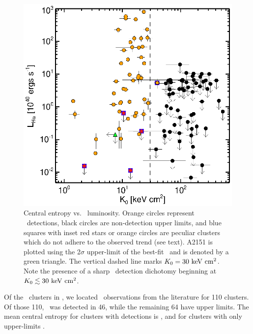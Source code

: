 \documentclass{emulateapj}
\begin{document}
\begin{figure}
  \begin{center}
    \includegraphics*[width=\columnwidth, trim=28mm 7mm 40mm 17mm, clip]{f1.eps}
    \caption{Central entropy vs. \halpha\ luminosity. Orange circles
      represent \halpha\ detections, black circles are non-detection
      upper limits, and blue squares with inset red stars or orange
      circles are peculiar clusters which do not adhere to the
      observed trend (see text). A2151 is plotted using the 2$\sigma$
      upper-limit of the best-fit \kna\ and is denoted by a green
      triangle. The vertical dashed line marks $K_0 = 30 \mathrm{\mbox{\ensuremath{\mathrm{~keV}}} \mathrm{\mbox{\ensuremath{\mathrm{~cm}}}^2}}$. Note
      the presence of a sharp \halpha\ detection dichotomy beginning
      at $K_0 \lesssim 30 \mathrm{\mbox{\ensuremath{\mathrm{~keV}}} \mathrm{\mbox{\ensuremath{\mathrm{~cm}}}^2}}$.}
    \label{fig:ha}
  \end{center}
\end{figure}

Of the \clnum\ clusters in \accept, we located \halpha\ observations
from the literature for 110 clusters. Of those 110, \halpha\ was
detected in 46, while the remaining 64 have upper limits. The mean
central entropy for clusters with detections is \fha, and for clusters
with only upper-limits \nfha.
\end{document}
